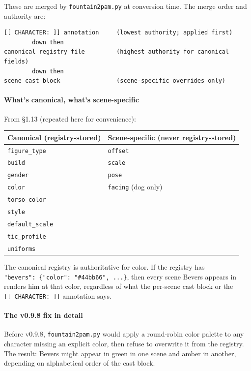 \documentclass[
  12pt,
  letterpaper,
]{book}
\begin{document}
These are merged by \texttt{fountain2pam.py} at conversion time. The
merge order and authority are:

\begin{verbatim}
[[ CHARACTER: ]] annotation     (lowest authority; applied first)
        down then
canonical registry file         (highest authority for canonical fields)
        down then
scene cast block                (scene-specific overrides only)
\end{verbatim}

\paragraph{What's canonical, what's
scene-specific}\label{whats-canonical-whats-scene-specific}

From §1.13 (repeated here for convenience):

\begin{longtable}[]{@{}ll@{}}
\toprule\noalign{}
Canonical (registry-stored) & Scene-specific (never registry-stored) \\
\midrule\noalign{}
\endhead
\bottomrule\noalign{}
\endlastfoot
\texttt{figure\_type} & \texttt{offset} \\
\texttt{build} & \texttt{scale} \\
\texttt{gender} & \texttt{pose} \\
\texttt{color} & \texttt{facing} (dog only) \\
\texttt{torso\_color} & \\
\texttt{style} & \\
\texttt{default\_scale} & \\
\texttt{tic\_profile} & \\
\texttt{uniforms} & \\
\end{longtable}

The canonical registry is authoritative for color. If the registry has
\texttt{"bevers":\ \{"color":\ "\#44bb66",\ ...\}}, then every scene
Bevers appears in renders him at that color, regardless of what the
per-scene cast block or the \texttt{{[}{[}\ CHARACTER:\ {]}{]}}
annotation says.

\paragraph{The v0.9.8 fix in detail}\label{the-v0.9.8-fix-in-detail}

Before v0.9.8, \texttt{fountain2pam.py} would apply a round-robin color
palette to any character missing an explicit color, then refuse to
overwrite it from the registry. The result: Bevers might appear in green
in one scene and amber in another, depending on alphabetical order of
the cast block.
\end{document}
